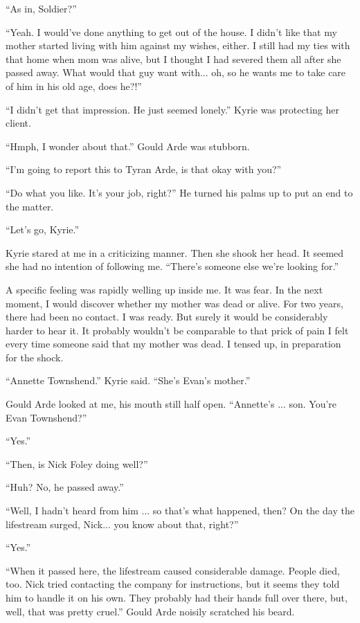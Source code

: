 \documentclass[oneside]{book}
\begin{document}
“As in, Soldier?”

“Yeah. I would’ve done anything to get out of the house. I didn’t like that my mother started living with him against my wishes, either. I still had my ties with that home when mom was alive, but I thought I had severed them all after she passed away. What would that guy want with... oh, so he wants me to take care of him in his old age, does he?!”

“I didn’t get that impression. He just seemed lonely.” Kyrie was protecting her client.

“Hmph, I wonder about that.” Gould Arde was stubborn.

“I’m going to report this to Tyran Arde, is that okay with you?”

“Do what you like. It’s your job, right?” He turned his palms up to put an end to the matter.

“Let’s go, Kyrie.”

Kyrie stared at me in a criticizing manner. Then she shook her head. It seemed she had no intention of following me. “There’s someone else we’re looking for.”

A specific feeling was rapidly welling up inside me. It was fear. In the next moment, I would discover whether my mother was dead or alive. For two years, there had been no contact. I was ready. But surely it would be considerably harder to hear it. It probably wouldn’t be comparable to that prick of pain I felt every time someone said that my mother was dead. I tensed up, in preparation for the shock.

“Annette Townshend.” Kyrie said. “She’s Evan’s mother.”

Gould Arde looked at me, his mouth still half open. “Annette’s ... son. You’re Evan Townshend?”

“Yes.”

“Then, is Nick Foley doing well?”

“Huh? No, he passed away.”

“Well, I hadn’t heard from him ... so that’s what happened, then? On the day the lifestream surged, Nick... you know about that, right?”

“Yes.”

“When it passed here, the lifestream caused considerable damage. People died, too. Nick tried contacting the company for instructions, but it seems they told him to handle it on his own. They probably had their hands full over there, but, well, that was pretty cruel.” Gould Arde noisily scratched his beard.
\end{document}
